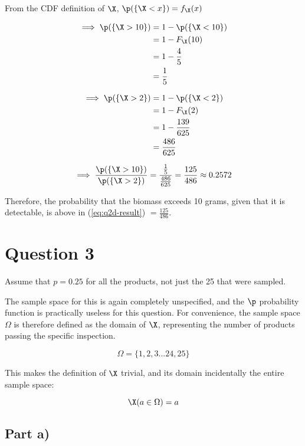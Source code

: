From the CDF definition of $\X$, $\p (\{ \X < x \}) = f_{\X}(x)$

\begin{align*}
\implies \p(\{ \X > 10 \}) &= 1 - \p (\{ \X < 10 \}) \\
&= 1 - F_{\X}(10) \\
&= 1 - \frac{4}{5} \\
&= \frac{1}{5}
\end{align*}

\begin{align*}
\implies \p(\{ \X > 2 \}) &= 1 - \p (\{ \X < 2 \}) \\
&= 1 - F_{\X}(2) \\
&= 1 - \frac{139}{625} \\
&= \frac{486}{625}
\end{align*}

\begin{equation}
\label{eq:q2d-result}
\implies \frac{\p(\{ \X > 10 \})}{\p (\{ \X > 2 \})}
= \frac{\frac{1}{5}}{\frac{486}{625}}
= \frac{125}{486}
\approx 0.2572
\end{equation}

Therefore, the probability that the biomass exceeds 10 grams, given that it is detectable, is above in (\ref{eq:q2d-result}) $ = \frac{125}{486}$.

\newpage

\section{Question 3}

Assume that $p = 0.25$ for all the products, not just the 25 that were sampled.

The sample space for this is again completely unspecified, and the $\p$ probability function is practically useless for this question.
For convenience, the sample space $\Omega$ is therefore defined as the domain of $\X$, representing the number of products passing the specific inspection.

\[
\Omega = \{ 1, 2, 3 ... 24, 25 \}
\]

This makes the definition of $\X$ trivial, and its domain incidentally the entire sample space:

\[
\X(a \in \Omega) = a
\]


\subsection{Part a)}


